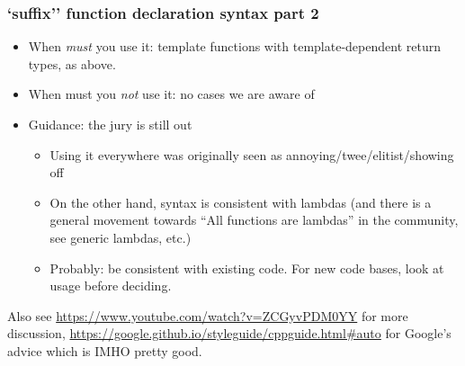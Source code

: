 \begin{frame}[fragile]
\frametitle{`suffix'' function declaration syntax part 2}
\begin{itemize}
\item When \emph{must} you use it: template functions with template-dependent return types, as above.
\item When must you \emph{not} use it: no cases we are aware of
\item Guidance: the jury is still out
  \begin{itemize}
  \item Using it everywhere was originally seen as annoying/twee/elitist/showing off
  \item On the other hand, syntax is consistent with lambdas (and there is a general movement
    towards ``All functions are lambdas'' in the community, see  generic lambdas, etc.)
  \item Probably: be consistent with existing code.  For new code bases, look at  usage before deciding.
\end{itemize}
\end{itemize}

Also see \url{https://www.youtube.com/watch?v=ZCGyvPDM0YY} for more discussion, \url{https://google.github.io/styleguide/cppguide.html#auto} for Google's advice which is IMHO pretty good.

\end{frame}
